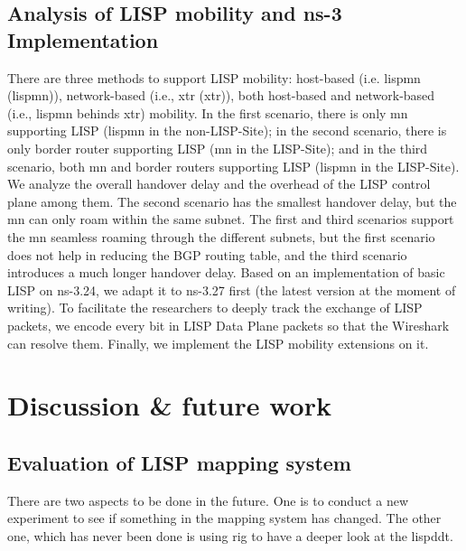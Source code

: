 \subsection{Analysis of LISP mobility and ns-3 Implementation}
There are three methods to support LISP mobility: host-based (i.e. \acrlong{lispmn} (\acrshort{lispmn})), network-based (i.e., \acrlong{xtr} (\acrshort{xtr})), both host-based and network-based (i.e., \acrshort{lispmn} behinds \acrshort{xtr}) mobility. %
In the first scenario, there is only \acrshort{mn} supporting LISP (\acrshort{lispmn} in the non-LISP-Site); in the second scenario, there is only border router supporting LISP (\acrshort{mn} in the LISP-Site); and in the third scenario, both \acrshort{mn} and border routers supporting LISP (\acrshort{lispmn} in the LISP-Site). We analyze the overall handover delay and the overhead of the LISP control plane among them. The second scenario has the smallest handover delay, but the \acrshort{mn} can only roam within the same subnet. The first and third scenarios support the \acrshort{mn} seamless roaming through the different subnets, but the first scenario does not help in reducing the BGP routing table, and the third scenario introduces a much longer handover delay. Based on an implementation of basic LISP on ns-3.24, we adapt it to ns-3.27 first (the latest version at the moment of writing). To facilitate the researchers to deeply track the exchange of LISP packets, we encode every bit in LISP Data Plane packets so that the Wireshark can resolve them. Finally, we implement the LISP mobility extensions on it.


\section{Discussion \& future work}

\subsection{Evaluation of LISP mapping system}
There are two aspects to be done in the future. One is to conduct a new experiment to see if something in the mapping system has changed. The other one, which has never been done is using \acrfull{rig} to have a deeper look at the \acrfull{lispddt}.


